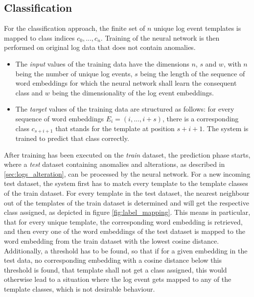 \subsection{Classification \label{sec:classification}}
For the classification approach, the finite set of $n$ unique log event templates is mapped to class indices $c_0, ..., c_n$. Training of the neural network is then performed on original log data that does not contain anomalies.
\begin{itemize}
\setlength\itemsep{-0.5em}
	\item The \textit{input} values of the training data have the dimensions $n$, $s$ and $w$, with $n$ being the number of unique log events, $s$ being the length of the sequence of word embeddings for which the neural network shall learn the consequent class and $w$ being the dimensionality of the log event embeddings.
	\item The \textit{target} values of the training data are structured as follows: for every sequence of word embeddings $E_i = (i, ..., i+s)$, there is a corresponding class $c_{s+i+1}$ that stands for the template at position $s+i+1$. The system is trained to predict that class correctly.
\end{itemize}

After training has been executed on the \textit{train} dataset, the prediction phase starts, where a \textit{test} dataset containing anomalies and alterations, as described in \ref{sec:logs_alteration}, can be processed by the neural network. For a new incoming test dataset, the system first has to match every template to the template classes of the train dataset. For every template in the test dataset, the nearest neighbour out of the templates of the train dataset is determined and will get the respective class assigned, as depicted in figure \ref{fig:label_mapping}. This means in particular, that for every unique template, the corresponding word embedding is retrieved, and then every one of the word embeddings of the test dataset is mapped to the word embedding from the train dataset with the lowest cosine distance. Additionally, a threshold has to be found, so that if for a given embedding in the test data, no corresponding embedding with a cosine distance below this threshold is found, that template shall not get a class assigned, this would otherwise lead to a situation where the log event gets mapped to any of the template classes, which is not desirable behaviour.


